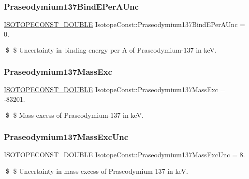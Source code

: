 \subsubsection{\texorpdfstring{Praseodymium137\+Bind\+E\+Per\+A\+Unc}{Praseodymium137BindEPerAUnc}}
{\footnotesize\ttfamily \mbox{\hyperlink{group___isotope_const-_macros_ga8f45a7272ce02c0b4c65c44636ed719a}{I\+S\+O\+T\+O\+P\+E\+C\+O\+N\+S\+T\+\_\+\+D\+O\+U\+B\+LE}} Isotope\+Const\+::\+Praseodymium137\+Bind\+E\+Per\+A\+Unc = 0.}

\$ \$ Uncertainty in binding energy per A of Praseodymium-\/137 in keV. \mbox{\label{group___isotope_const-_praseodymium-_pr137_ga604664550019c8f8ffb7fec8d9021458}} 
\subsubsection{\texorpdfstring{Praseodymium137\+Mass\+Exc}{Praseodymium137MassExc}}
{\footnotesize\ttfamily \mbox{\hyperlink{group___isotope_const-_macros_ga8f45a7272ce02c0b4c65c44636ed719a}{I\+S\+O\+T\+O\+P\+E\+C\+O\+N\+S\+T\+\_\+\+D\+O\+U\+B\+LE}} Isotope\+Const\+::\+Praseodymium137\+Mass\+Exc = -\/83201.}

\$ \$ Mass excess of Praseodymium-\/137 in keV. \mbox{\label{group___isotope_const-_praseodymium-_pr137_ga6a84f962f0e3669a234f5847b8f008b4}} 
\subsubsection{\texorpdfstring{Praseodymium137\+Mass\+Exc\+Unc}{Praseodymium137MassExcUnc}}
{\footnotesize\ttfamily \mbox{\hyperlink{group___isotope_const-_macros_ga8f45a7272ce02c0b4c65c44636ed719a}{I\+S\+O\+T\+O\+P\+E\+C\+O\+N\+S\+T\+\_\+\+D\+O\+U\+B\+LE}} Isotope\+Const\+::\+Praseodymium137\+Mass\+Exc\+Unc = 8.}

\$ \$ Uncertainty in mass excess of Praseodymium-\/137 in keV. \mbox{\label{group___isotope_const-_praseodymium-_pr137_gab208e73f446b9f12a18bd36ff8ef1ca6}} 
